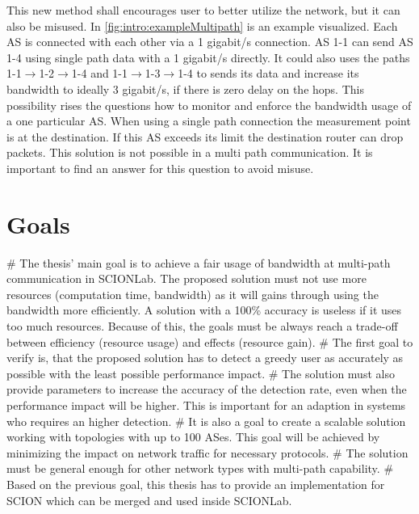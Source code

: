 \documentclass[thesis.tex]{subfiles}
\begin{document}
This new method shall encourages user to better utilize the network, but it can also be misused. In \autoref{fig:intro:exampleMultipath} is an example visualized. Each AS is connected with each other via a 1 gigabit/s connection. AS 1-1 can send AS 1-4 using single path data with a 1 gigabit/s directly. It could also uses the paths 1-1$\rightarrow$1-2$\rightarrow$1-4 and 1-1$\rightarrow$1-3$\rightarrow$1-4 to sends its data and increase its bandwidth to ideally 3 gigabit/s, if there is zero delay on the hops. This possibility rises the questions how to monitor and enforce the bandwidth usage of a one particular AS. When using a single path connection the measurement point is at the destination. If this AS exceeds its limit the destination router can drop packets. This solution is not possible in a multi path communication. It is important to find an answer for this question to avoid misuse.

\section{Goals} \label{sec:intro:goals}
     \begin{easylist}
        \MyNumberedListProperties
        # The thesis' main goal is to achieve a fair usage of bandwidth at multi-path communication in SCIONLab. The proposed solution must not use more resources (computation time, bandwidth) as it will gains through using the bandwidth more efficiently. A solution with a 100\% accuracy is useless if it uses too much resources. Because of this, the goals must be always reach a trade-off between efficiency (resource usage) and effects (resource gain).        
        # The first goal to verify is, that the proposed solution has to detect a greedy user as accurately as possible with the least possible performance impact.
        # The solution must also provide parameters to increase the accuracy of the detection rate, even when the performance impact will be higher. This is important for an adaption in systems who requires an higher detection.
        # It is also a goal to create a scalable solution working with topologies with up to 100 ASes. This goal will be achieved by minimizing the impact on network traffic for necessary protocols.        
        # The solution must be general enough for other network types with multi-path capability.        
        # Based on the previous goal, this thesis has to provide an implementation for SCION which can be merged and used inside SCIONLab.
    \end{easylist}
\end{document}
